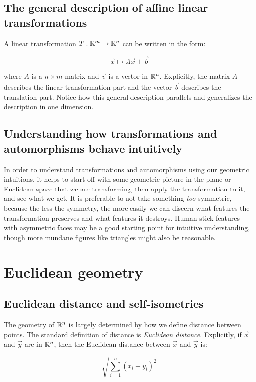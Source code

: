 \documentclass[10pt]{amsart}
\begin{document}
\subsection{The general description of affine linear transformations}

A linear transformation $T:\mathbb{R}^m \to \mathbb{R}^n$ can be written in the form:

$$\vec{x} \mapsto A\vec{x} + \vec{b}$$

where $A$ is a $n \times m$ matrix and $\vec{v}$ is a vector in
$\mathbb{R}^n$. Explicitly, the matrix $A$ describes the linear transformation
part and the vector $\vec{b}$ describes the translation part. Notice
how this general description parallels and generalizes the description
in one dimension.

\subsection{Understanding how transformations and automorphisms behave intuitively}

In order to understand transformations and automorphisms using our
geometric intuitions, it helps to start off with some geometric
picture in the plane or Euclidean space that we are transforming, then
apply the transformation to it, and see what we get. It is preferable
to not take something {\em too} symmetric, because the less the
symmetry, the more easily we can discern what features the
transformation preserves and what features it destroys. Human stick
features with asymmetric faces may be a good starting point for
intuitive understanding, though more mundane figures like triangles
might also be reasonable.

\section{Euclidean geometry}

\subsection{Euclidean distance and self-isometries}

The geometry of $\mathbb{R}^n$ is largely determined by how we define distance
between points. The standard definition of distance is {\em Euclidean
  distance}. Explicitly, if $\vec{x}$ and $\vec{y}$ are in $\mathbb{R}^n$,
then the Euclidean distance between $\vec{x}$ and $\vec{y}$ is:

$$\sqrt{\sum_{i=1}^n (x_i - y_i)^2}$$
\end{document}
